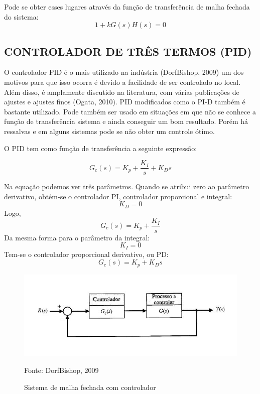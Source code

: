 \documentclass[a4paper,12pt]{article}
\begin{document}
Pode se obter esses lugares através da função de transferência de malha fechada do sistema:
\begin{equation}\label{eq:1}
1 + kG(s)H(s) = 0
\end{equation}

\subsection{CONTROLADOR DE TRÊS TERMOS (PID)}
O controlador PID é o mais utilizado na indústria (DorfBishop, 2009) um dos motivos para que isso ocorra é devido a facilidade de ser controlado no local. Além disso, é amplamente discutido na literatura, com várias publicações de ajustes e ajustes finos (Ogata, 2010). PID modificados como o PI-D também é bastante utilizado. Pode também ser usado em situações em que não se conhece a função de transferência sistema e ainda conseguir um bom resultado. Porém há ressalvas e em alguns sistemas pode se não obter um controle ótimo.

O PID tem como função de transferência a seguinte expressão:

\begin{equation}\label{eq:1}
G_c(s) = K_p + \frac{K_I}{s} + K_D s
\end{equation}

Na equação podemos ver três parâmetros. Quando se atribui zero ao parâmetro derivativo, obtém-se o controlador PI, controlador proporcional e integral:  \[K_D = 0 \] 
Logo, \[G_c(s) = K_p + \frac{K_I}{s} \]
Da mesma forma para o parâmetro da integral:
\[K_I = 0 \] 
Tem-se o controlador proporcional derivativo, ou PD: \[G_c(s) = K_p + K_D s \]

\begin{figure}[!h]
\centering
\includegraphics[scale=1]{controlador-malha-fechada.jpg}
\caption{Sistema de malha fechada com controlador}
\label{fig:sistema}
{Fonte: DorfBishop, 2009}
\end{figure}
\end{document}
